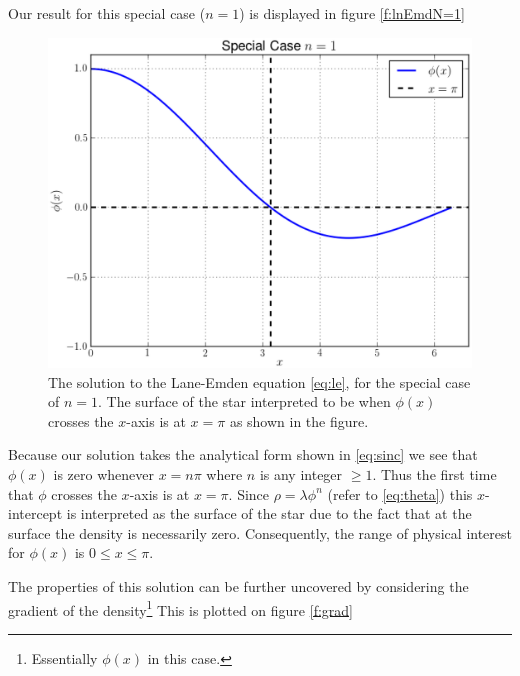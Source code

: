 \documentclass[12pt, manuscript]{article}
\begin{document}
Our result for this special case ($n=1$) is displayed in figure \eqref{f:lnEmdN=1}

\begin{figure}[h]
  \begin{center}
      \includegraphics[scale=0.7]{images/LanEmdNeq1.eps}
  \caption{The solution to the Lane-Emden equation \eqref{eq:le}, for the special case of $n=1$. The surface of the star interpreted to be when $\phi(x)$ crosses the $x$-axis is at $x=\pi$ as shown in the figure.}\label{f:lnEmdN=1}
\end{center}
\end{figure}

Because our solution takes the analytical form shown in \eqref{eq:sinc} we see that $\phi(x)$ is zero whenever $x=n\pi$ where $n$ is any integer $\ge 1$. Thus the first time that $\phi$ crosses the $x$-axis is at $x=\pi$. Since $\rho = \lambda\phi^{n}$ (refer to \eqref{eq:theta})  this $x$-intercept is interpreted as the surface of the star due to the fact that at the surface the density is necessarily zero. Consequently, the range of physical interest for $\phi(x)$ is $0\le x\le\pi$.

The properties of this solution can be further uncovered by considering the gradient of the density\footnote{Essentially $\phi(x)$ in this case.} This is plotted on figure \eqref{f:grad}
\end{document}
